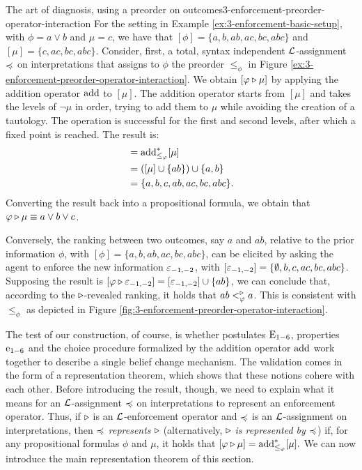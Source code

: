 \begin{xmpl}{The art of diagnosis, using a preorder on outcomes}{3-enforcement-preorder-operator-interaction}
	For the setting in Example \ref{ex:3-enforcement-basic-setup},
	with $\phi=a\lor b$ and $\mu=c$, 
	we have that $[\phi]=\{a,b,ab,ac,bc,abc\}$ and $[\mu]=\{c,ac,bc,abc\}$.
	Consider, first, a total, syntax independent $\mathcal{L}$-assignment $\preccurlyeq$ on interpretations
	that assigns to $\phi$ the preorder $\le_{\phi}$
	in Figure \ref{ex:3-enforcement-preorder-operator-interaction}.
	We obtain $[\varphi \triangleright \mu]$ by applying the addition operator ${\operatorname{add}}$
	to $[\mu]$.
	The addition operator starts from $[\mu]$ 
	and takes the levels of ${\lnot\mu}$ in order, trying to add them
	to $\mu$ while avoiding the creation of a tautology. 
	The operation is successful for the first and second levels, after which
	a fixed point is reached.
	The result is:
	\begin{align*}
		[\phi\en\mu] &=\add^\ast_{\le_\phi}[\mu]\\
					 &=([\mu]\cup\{ab\})\cup \{a,b\}\\
					 &=\{a,b,c,ab,ac,bc,abc\}.
	\end{align*}
	Converting the result back into a propositional formula,
	we obtain that $\varphi\triangleright\mu\equiv a\lor b\lor c$.

	Conversely, the ranking between two outcomes, 
	say $a$ and $ab$, 
	relative 
	to the prior information $\phi$, with $[\phi]=\{a,b,ab,ac,bc,abc\}$,
	can be elicited by asking the agent 
	to enforce the new information $\varepsilon_{-1,-2}$,
	with $[\varepsilon_{-1,-2}]=\{\emptyset,b,c,ac,bc,abc\}$.
	Supposing the result is $[\varphi\triangleright\varepsilon_{-1,-2}]=[\varepsilon_{-1,-2}]\cup\{ab\}$,
	we can conclude that, according to the $\triangleright$-revealed ranking,
	it holds that $ab<^{\triangleright}_{\varphi}a$.
	This is consistent with $\le_{\phi}$ 
	as depicted in Figure \ref{fig:3-enforcement-preorder-operator-interaction}.
\end{xmpl}

The test of our construction, of course, is whether 
postulates $\mathrm{E}_{1-6}$, properties $\mathrm{e}_{1-6}$ and the choice 
procedure formalized by the addition operator ${\operatorname{add}}$
work together to describe a single belief change mechanism.
The validation comes in the form of a representation theorem,
which shows that these notions cohere with each other.
Before introducing the result, though,
we need to explain what it means for an $\mathcal{L}$-assignment 
$\preccurlyeq$ on interpretations to represent an enforcement operator.
Thus, if $\triangleright$ is an $\mathcal{L}$-enforcement operator 
and $\preccurlyeq$ is an $\mathcal{L}$-assignment on interpretations,
then \emph{$\preccurlyeq$ represents $\triangleright$}
(alternatively, \emph{$\triangleright$ is represented by $\preccurlyeq$})
if, for any propositional formulas $\phi$ and $\mu$,
it holds that $[\varphi\triangleright\mu]={\operatorname{add}}^\ast_{\le_\varphi}[\mu].$
We can now introduce the main representation theorem 
of this section.


